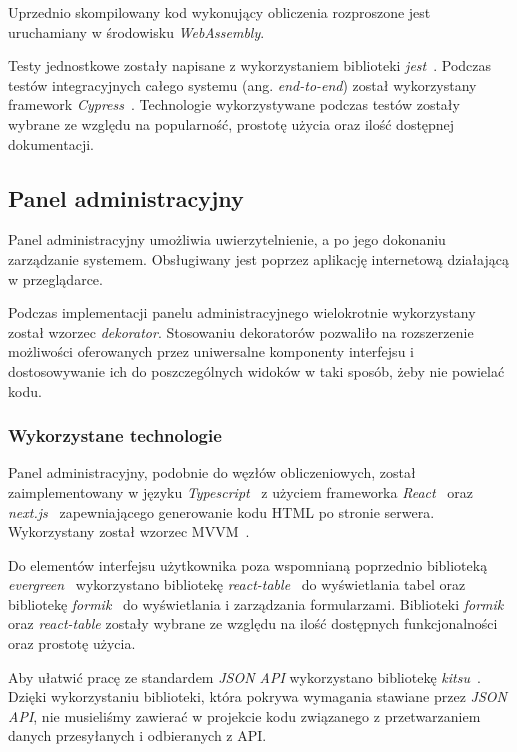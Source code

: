 \documentclass[a4paper,11pt,twoside]{report}
\theoremstyle{definition}
\begin{document}
Uprzednio skompilowany kod wykonujący obliczenia rozproszone jest uruchamiany w środowisku \textit{WebAssembly}.

Testy jednostkowe zostały napisane z wykorzystaniem biblioteki \textit{jest}~\cite{jest}. Podczas testów integracyjnych całego systemu (ang. \textit{end-to-end}) został wykorzystany framework \textit{Cypress}~\cite{cypress}. Technologie wykorzystywane podczas testów zostały wybrane ze względu na popularność, prostotę użycia oraz ilość dostępnej dokumentacji.

\subsection{Panel administracyjny}

Panel administracyjny umożliwia uwierzytelnienie, a po jego dokonaniu zarządzanie systemem. Obsługiwany jest poprzez aplikację internetową działającą w przeglądarce.

Podczas implementacji panelu administracyjnego wielokrotnie wykorzystany został wzorzec \textit{dekorator}. Stosowaniu dekoratorów pozwaliło na rozszerzenie możliwości oferowanych przez uniwersalne komponenty interfejsu i dostosowywanie ich do poszczególnych widoków w taki sposób, żeby nie powielać kodu.


\subsubsection{Wykorzystane technologie}
Panel administracyjny, podobnie do węzłów obliczeniowych, został zaimplementowany w języku \textit{Typescript}~\cite{typescript} z użyciem frameworka \textit{React}~\cite{react} oraz \textit{next.js}~\cite{next.js} zapewniającego generowanie kodu HTML po stronie serwera. Wykorzystany został wzorzec MVVM~\cite{mvvm}.

Do elementów interfejsu użytkownika poza wspomnianą poprzednio biblioteką \textit{evergreen}~\cite{evergreen} wykorzystano bibliotekę \textit{react-table}~\cite{react-table} do wyświetlania tabel oraz bibliotekę \textit{formik}~\cite{formik} do wyświetlania i zarządzania formularzami. Biblioteki \textit{formik} oraz \textit{react-table} zostały wybrane ze względu na ilość dostępnych funkcjonalności oraz prostotę użycia.

Aby ułatwić pracę ze standardem \textit{JSON API} wykorzystano bibliotekę \textit{kitsu}~\cite{kitsu}.
Dzięki wykorzystaniu biblioteki, która pokrywa wymagania stawiane przez \textit{JSON API}, nie musieliśmy zawierać w projekcie kodu związanego z przetwarzaniem danych przesyłanych i odbieranych z API.
\end{document}

